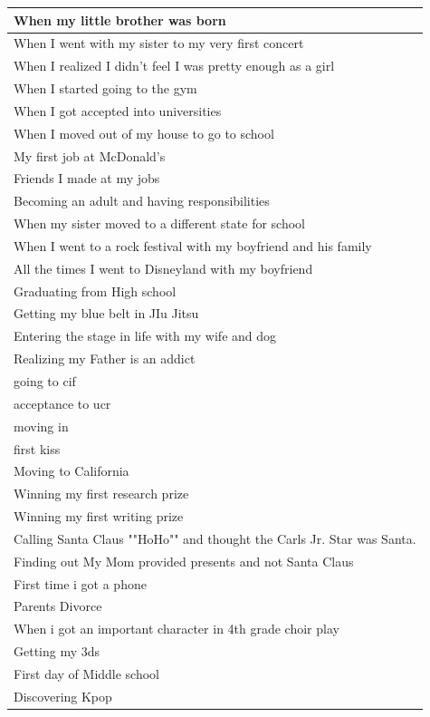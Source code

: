 \documentclass[
  .7em,
  letterpaper,
  DIV=11,
  numbers=noendperiod]{scrartcl}
\begin{document}
\begin{table}
\begin{tabular}{l}
\hline
When my little brother was born\\
\hline
When I went with my sister to my very first concert\\
\hline
When I realized I didn’t feel I was pretty enough as a girl\\
\hline
When I started going to the gym\\
\hline
When I got accepted into universities\\
\hline
When I moved out of my house to go to school\\
\hline
My first job at McDonald’s\\
\hline
Friends I made at my jobs\\
\hline
Becoming an adult and having responsibilities\\
\hline
When my sister moved to a different state for school\\
\hline
When I went to a rock festival with my boyfriend and his family\\
\hline
All the times I went to Disneyland with my boyfriend\\
\hline
Graduating from High school\\
\hline
Getting my blue belt in JIu Jitsu\\
\hline
Entering the stage in life with my wife and dog\\
\hline
Realizing my Father is an addict\\
\hline
going to cif\\
\hline
acceptance to ucr\\
\hline
moving in\\
\hline
first kiss\\
\hline
Moving to California\\
\hline
Winning my first research prize\\
\hline
Winning my first writing prize\\
\hline
Calling Santa Claus ""HoHo"" and thought the Carls Jr. Star was Santa.\\
\hline
Finding out My Mom provided presents and not Santa Claus\\
\hline
First time i got a phone\\
\hline
Parents Divorce\\
\hline
When i got an important character in 4th grade choir play\\
\hline
Getting my 3ds\\
\hline
First day of Middle school\\
\hline
Discovering Kpop\\

\end{tabular}
\end{table}
\end{document}

